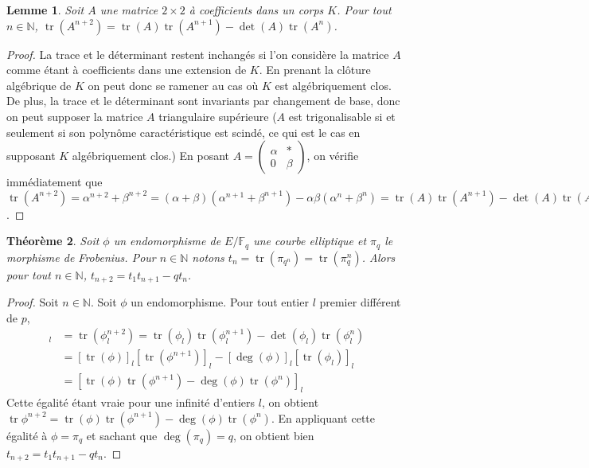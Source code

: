 \documentclass{article}
\theoremstyle{plain}%
\newtheorem{thm}{Théorème}[section]
\newtheorem{lem}[thm]{Lemme}
\theoremstyle{definition}%
\newcommand{\F}{\mathbb{F}}
\newcommand{\N}{\mathbb{N}}
\DeclareMathOperator{\tr}{tr}
\begin{document}
\begin{lem}
  Soit $A$ une matrice $2\times 2$ à coefficients dans un corps $K$. Pour tout $n\in\N$, $\tr(A^{n+2}) = \tr(A)\tr(A^{n+1}) - \det(A)\tr(A^n)$.
\end{lem}

\begin{proof}
  La trace et le déterminant restent inchangés si l'on considère la matrice $A$ comme étant à coefficients dans une extension de $K$. En prenant la clôture algébrique de $K$ on peut donc se ramener au cas où $K$ est algébriquement clos. De plus, la trace et le déterminant sont invariants par changement de base, donc on peut supposer la matrice $A$ triangulaire supérieure ($A$ est trigonalisable si et seulement si son polynôme caractéristique est scindé, ce qui est le cas en supposant $K$ algébriquement clos.) En posant $A = \begin{pmatrix} \alpha & * \\ 0 & \beta \end{pmatrix}$, on vérifie immédiatement que $\tr(A^{n+2}) = \alpha^{n+2} + \beta^{n+2} = (\alpha + \beta)(\alpha^{n+1} + \beta^{n+1}) - \alpha\beta(\alpha^n + \beta^n) = \tr(A)\tr(A^{n+1}) - \det(A)\tr(A^n)$.
\end{proof}

\begin{thm}
  Soit $\phi$ un endomorphisme de $E/\F_q$ une courbe elliptique et $\pi_q$ le morphisme de Frobenius. Pour $n\in\N$ notons $t_n = \tr(\pi_{q^n}) = \tr(\pi_q^n)$. Alors pour tout $n\in\N$, $t_{n+2} = t_1t_{n+1} - qt_n$.
\end{thm}

\begin{proof}
  Soit $n\in\N$. Soit $\phi$ un endomorphisme. Pour tout entier $l$ premier différent de $p$, 
  \begin{align*} 
    [\tr\phi^{n+2}]_l 
    &= \tr(\phi_l^{n+2}) 
    = \tr(\phi_l)\tr(\phi_l^{n+1})-\det(\phi_l)\tr(\phi_l^n) \\
    &= [\tr(\phi)]_l [\tr(\phi^{n+1})]_l-[\deg(\phi)]_l[\tr(\phi_l)]_l \\
    &= [\tr(\phi)\tr(\phi^{n+1})-\deg(\phi)\tr(\phi^n)]_l 
  \end{align*}
  Cette égalité étant vraie pour une infinité d'entiers $l$, on obtient $\tr\phi^{n+2} =  \tr(\phi)\tr(\phi^{n+1})-\deg(\phi)\tr(\phi^n)$. En appliquant cette égalité à $\phi = \pi_q$ et sachant que $\deg(\pi_q)=q$, on obtient bien $t_{n+2} = t_1t_{n+1}-qt_n$. 

\end{proof}
\end{document}
